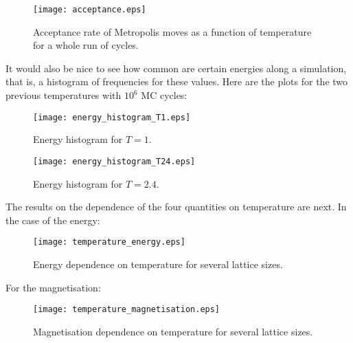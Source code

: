 \documentclass[11pt,a4paper,oneside]{article}
\begin{document}
		\begin{figure}[H]\begin{center}\texttt{[image: acceptance.eps]}\par\protect\caption{\scriptsize Acceptance rate of Metropolis moves as a function of temperature for a whole run of cycles.}\end{center}\end{figure}\vspace{3 cm}
		
		It would also be nice to see how common are certain energies along a simulation, that is, a histogram of frequencies for these values. Here are the plots for the two previous temperatures with $10^6$ MC cycles:\\
		
		\begin{figure}[ht!]\begin{center}\texttt{[image: energy\_histogram\_T1.eps]}\par\protect\caption{\scriptsize Energy histogram for $T=1$.}\end{center}\end{figure}\newpage
		
		\begin{figure}[ht!]\begin{center}\texttt{[image: energy\_histogram\_T24.eps]}\par\protect\caption{\scriptsize Energy histogram for $T=2.4$.}\end{center}\end{figure}
		
		The results on the dependence of the four quantities on temperature are next. In the case of the energy:\\
		
		\begin{figure}[ht!]\begin{center}\texttt{[image: temperature\_energy.eps]}\par\protect\caption{\scriptsize Energy dependence on temperature for several lattice sizes.}\end{center}\end{figure}
		
		For the magnetisation:\\
		
		\begin{figure}[ht!]\begin{center}\texttt{[image: temperature\_magnetisation.eps]}\par\protect\caption{\scriptsize Magnetisation dependence on temperature for several lattice sizes.}\end{center}\end{figure}
		
\end{document}
